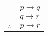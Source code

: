 \documentclass{standalone}
\begin{document}
\begin{tabular}{rl}
    & $p\to q$ \\
    & $q\to r$ \\
    \hline
    $\therefore$ & $p \to r$
\end{tabular}
\end{document}
